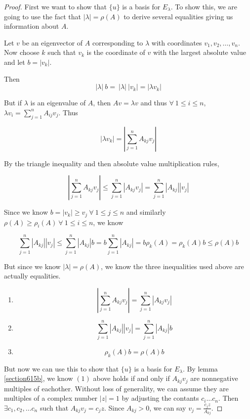 \documentclass{amsart}
\theoremstyle{definition}
\theoremstyle{remark}
\numberwithin{equation}{section}
\begin{document}
\begin{proof}

First we want to show that $\{ u \}$ is a basis for $E_{\lambda}$.
To show this, we are going to use the fact that $|\lambda| = \rho(A)$ to derive several equalities giving us information about $A$.

Let $v$ be an eigenvector of $A$ corresponding to $\lambda$ with coordinates $v_1, v_2, \ldots, v_n$.  
Now choose $k$ such that $v_k$ is the coordinate of $v$ with the largest absolute value and let $b = |v_k|$.

Then $$ |\lambda|\ b =\ |\lambda|\ |v_k| = |\lambda v_k| $$

But if $\lambda$ is an eigenvalue of $A$, then $Av = \lambda v$ and thus $\forall\ 1 \leq i \leq n$, $\lambda v_i = \sum_{j = 1}^n A_{ij}v_j$.
Thus

$$ |\lambda v_k| = | \sum_{j = 1}^n A_{kj}v_j | $$

By the triangle inequality and then absolute value multiplication rules,

$$ | \sum_{j = 1}^n A_{kj}v_j | \leq \sum_{j=1}^n |A_{kj}v_j| = \sum_{j=1}^n |A_{kj}| |v_j| $$

Since we know $b = |v_k| \geq v_j\ \forall\ 1 \leq j \leq n$ and similarly $\rho(A) \geq  \rho_i(A)\ \forall\ 1 \leq i \leq n $, we know 

$$ \sum_{j=1}^n |A_{kj}| |v_j|  \leq \sum_{j=1}^n |A_{kj}| b = b \sum_{j=1}^n |A_{kj}| =  b\rho_k(A) = \rho_k(A)b \leq \rho(A)b $$


But since we know $|\lambda| = \rho(A)$, we know the three inequalities used above are actually equalities.

\begin{enumerate}

	\item $$| \sum_{j = 1}^n A_{kj}v_j | = \sum_{j=1}^n |A_{kj}v_j|$$

	\item $$\sum_{j=1}^n |A_{kj}| |v_j|  = \sum_{j=1}^n |A_{kj}| b$$

	\item $$\rho_k(A)b = \rho(A)b$$ \newline

\end{enumerate}


But now we can use this to show that $\{ u \}$ is a basis for $E_{\lambda}$.
By lemma \ref{section615b}, we know $(1)$ above holds if and only if $A_{kj}v_j$ are nonnegative multiples of eachother.
Without loss of generality, we can assume they are multiples of a complex number $|z| = 1$ by adjusting the contants $c_i \ldots c_n$.
Then $\exists c_1, c_2, \ldots c_n$ such that $A_{kj}v_j = c_j z$.
Since $A_{kj} > 0$, we can say $v_j = \frac{c_jz}{A_{kj}}$.


\end{proof}
\end{document}
